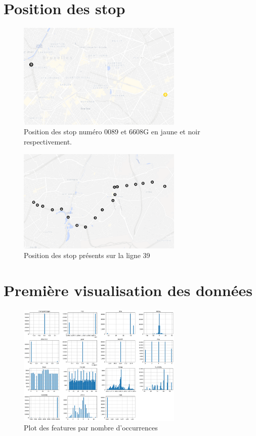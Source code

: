 \begin{appendices}
    \chapter{Position des stop}
    \begin{figure}[ht]
        \centering
        \includegraphics[width=0.7\textwidth]{images/stop_pos_1.png}
        \caption{Position des stop numéro 0089 et 6608G en jaune et noir respectivement.}
        \label{appendix:stop_pos_1}
    \end{figure}

    \begin{figure}[ht]
        \centering
        \includegraphics[width=0.7\textwidth]{images/stop_pos_2.png}
        \caption{Position des stop présents sur la ligne 39}
        \label{appendix:stop_pos_2}
    \end{figure}

    \chapter{Première visualisation des données}
    \begin{figure}[ht]
        \centering
        \includegraphics[width=0.7\textwidth]{images/plots.png}
        \caption{Plot des features par nombre d'occurrences}
        \label{appendix:plots}
    \end{figure}


\end{appendices}
